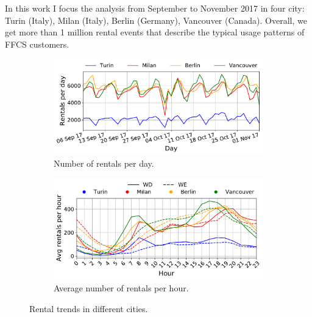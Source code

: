 
In this work I focus the analysis from September to November 2017 in four city: Turin (Italy), Milan (Italy), Berlin (Germany), Vancouver (Canada).
Overall, we get more than 1 million rental events that describe the typical usage patterns of FFCS customers. 


\begin{figure}[t]
    \begin{center}
        \begin{subfigure}{0.49\textwidth}
            \includegraphics[width=\columnwidth]{figures/bookings_per_day.pdf}
            \caption{Number of rentals per day.}
            \label{fig:rentals_per_day}
        \end{subfigure}
         \begin{subfigure}{0.49\textwidth}
             \includegraphics[width=\columnwidth]{figures/aggBookginfsPerHour.pdf}
             \caption{Average number of rentals per hour.}
             \label{fig:rentals_per_hour}
         \end{subfigure}
         \caption{Rental trends in different cities.}
         \label{fig:rentals_trends}
\end{center}
\end{figure}


